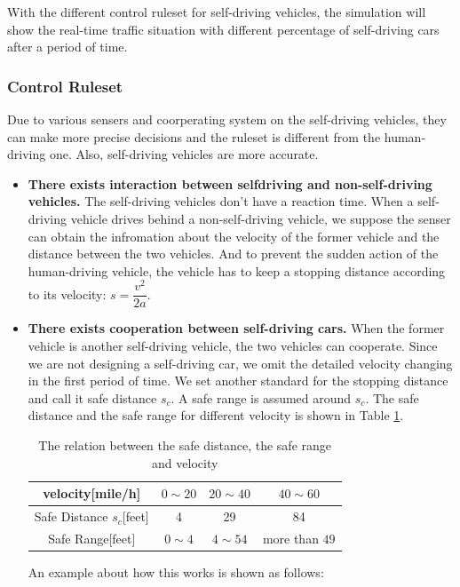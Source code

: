 \documentclass[a4paper]{article}
\begin{document}
	With the different control ruleset for self-driving vehicles, the simulation will show the real-time traffic situation with different percentage of self-driving cars after a period of time.
	
	\subsubsection{Control Ruleset}
	Due to various sensers and coorperating system on the self-driving vehicles, they can make more precise decisions and the ruleset is different from the human-driving one. Also, self-driving vehicles are more accurate.
	\begin{itemize}
		\item \textbf{There exists interaction between selfdriving
			and non-self-driving vehicles.} The self-driving vehicles don't have a reaction time. When a self-driving vehicle drives behind a non-self-driving vehicle, we suppose the senser can obtain the infromation about the velocity of the former vehicle and the distance between the two vehicles. And to prevent the sudden action of the human-driving vehicle, the vehicle has to keep a stopping distance according to its velocity: $ s=\dfrac{v^2}{2a} $. 
		\item \textbf{There exists cooperation between self-driving cars.} When the former vehicle is another self-driving vehicle, the two vehicles can cooperate. Since we are not designing a self-driving car, we omit the detailed velocity changing in the first period of time. We set another standard for the stopping distance and call it safe distance $ s_c $. A safe range is assumed around $ s_c $. The safe distance and the safe range for different velocity is shown in Table \ref{range}. 
		
		\begin{table}[H]
			\centering
			\begin{tabular}{cccc}
				\toprule
				velocity[mile/h] & $ 0\sim20 $  & $ 20\sim40 $ & $ 40\sim60 $ \\
				\midrule
				Safe Distance $ s_c $[feet]  & 4     & 29    & 84 \\
				Safe Range[feet] & $ 0\sim4 $  & $ 4\sim54 $ & more than $ 49 $ \\
				\bottomrule
			\end{tabular}%
			\caption{The relation between the safe distance, the safe range and velocity}
			\label{range}%
		\end{table}%
		
		An example about how this works is shown as follows:
		

\end{itemize}
\end{document}
